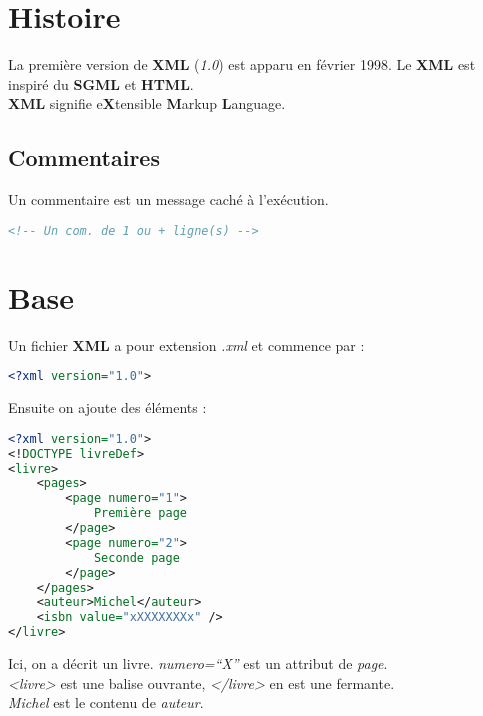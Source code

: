 


    \section{Histoire}
        La première version de \textbf{XML} (\textit{1.0}) est apparu en février 1998. Le \textbf{XML} est inspiré du \textbf{SGML} et \textbf{HTML}.\\
        \textbf{XML} signifie e\textbf{X}tensible \textbf{M}arkup \textbf{L}anguage.

        \subsection{Commentaires}
            Un commentaire est un message caché à l'exécution.
            \begin{lstlisting}[language=XML]
<!-- Un com. de 1 ou + ligne(s) -->
            \end{lstlisting}
    \section{Base}
        Un fichier \textbf{XML} a pour extension \textit{.xml} et commence par :
        \begin{lstlisting}[language=XML]
<?xml version="1.0">
        \end{lstlisting}
        Ensuite on ajoute des éléments :
        \begin{lstlisting}[language=XML]
<?xml version="1.0">
<!DOCTYPE livreDef>
<livre>
	<pages>
		<page numero="1">
			Première page
		</page>
		<page numero="2">
			Seconde page
		</page>
	</pages>
	<auteur>Michel</auteur>
	<isbn value="xXXXXXXXx" />
</livre>
        \end{lstlisting}
        Ici, on a décrit un livre. \textit{numero=``X''} est un attribut de \textit{page}.\\
        \textit{<livre>} est une balise ouvrante, \textit{</livre>} en est une fermante.\\
        \textit{Michel} est le contenu de \textit{auteur}.
